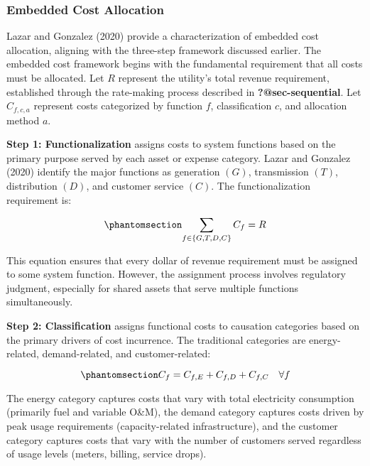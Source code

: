 \documentclass[
  11pt,
]{article}
\begin{document}
\subsubsection{Embedded Cost Allocation}\label{embedded-cost-allocation}

Lazar and Gonzalez (2020) provide a characterization of embedded cost
allocation, aligning with the three-step framework discussed earlier.
The embedded cost framework begins with the fundamental requirement that
all costs must be allocated. Let \(R\) represent the utility's total
revenue requirement, established through the rate-making process
described in \textbf{?@sec-sequential}. Let \(C_{f,c,a}\) represent
costs categorized by function \(f\), classification \(c\), and
allocation method \(a\).

\textbf{Step 1: Functionalization} assigns costs to system functions
based on the primary purpose served by each asset or expense category.
Lazar and Gonzalez (2020) identify the major functions as generation
\((G)\), transmission \((T)\), distribution \((D)\), and customer
service \((C)\). The functionalization requirement is:

\begin{equation}\phantomsection\label{eq-functionalization}{\sum_{f \in \{G,T,D,C\}} C_f = R}\end{equation}

This equation ensures that every dollar of revenue requirement must be
assigned to some system function. However, the assignment process
involves regulatory judgment, especially for shared assets that serve
multiple functions simultaneously.

\textbf{Step 2: Classification} assigns functional costs to causation
categories based on the primary drivers of cost incurrence. The
traditional categories are energy-related, demand-related, and
customer-related:

\begin{equation}\phantomsection\label{eq-classification}{C_f = C_{f,E} + C_{f,D} + C_{f,C} \quad \forall f}\end{equation}

The energy category captures costs that vary with total electricity
consumption (primarily fuel and variable O\&M), the demand category
captures costs driven by peak usage requirements (capacity-related
infrastructure), and the customer category captures costs that vary with
the number of customers served regardless of usage levels (meters,
billing, service drops).
\end{document}
